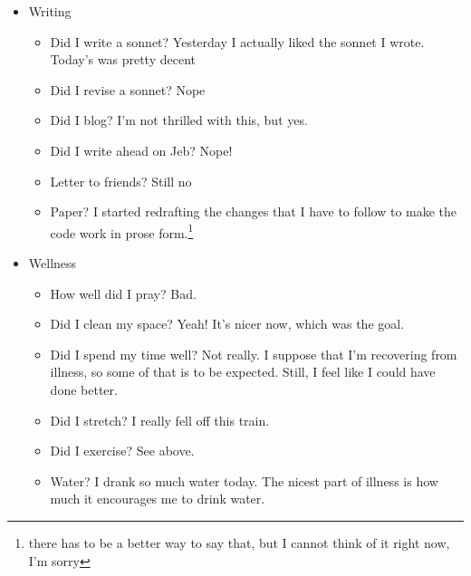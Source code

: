 \documentclass[12pt]{article}[titlepage]
\newcommand{\1}{\={a}}
\newcommand{\2}{\={e}}
\newcommand{\3}{\={\i}}
\newcommand{\4}{\=o}
\newcommand{\5}{\=u}
\newcommand{\6}{\={A}}
\renewcommand{\,}{\textsuperscript{,}}
\begin{document}
\begin{itemize}
\item Writing
\begin{itemize}
\item Did I write a sonnet? Yesterday I actually liked the sonnet I wrote. Today's was pretty decent
\item Did I revise a sonnet? Nope
\item Did I blog? I'm not thrilled with this, but yes.
\item Did I write ahead on Jeb? Nope!
\item Letter to friends? Still no
\item Paper? I started redrafting the changes that I have to follow to make the code work in prose form.\footnote{there has to be a better way to say that, but I cannot think of it right now, I'm sorry}
\end{itemize}
\item Wellness
\begin{itemize}
\item How well did I pray? Bad.
\item Did I clean my space? Yeah! It's nicer now, which was the goal.
\item Did I spend my time well? Not really. I suppose that I'm recovering from illness, so some of that is to be expected. Still, I feel like I could have done better.
\item Did I stretch? I really fell off this train.
\item Did I exercise? See above.
\item Water? I drank so much water today. The nicest part of illness is how much it encourages me to drink water.
\end{itemize}
\end{itemize}
\end{document}
